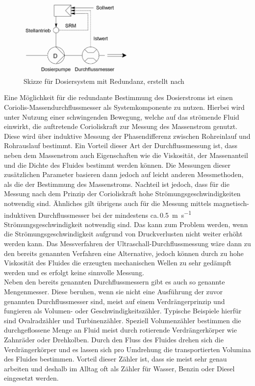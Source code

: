 \begin{figure}[h!]
	\centering
	\includegraphics[width=0.5\textwidth]{img/redundanz}
	\caption{Skizze für Dosiersystem mit Redundanz, erstellt nach \cite{Vetter.2002}}
	\label{fig:redundanz}
\end{figure}
\FloatBarrier


Eine Möglichkeit für die redundante Bestimmung des Dosierstroms ist einen Coriolis-Massendurchflussmesser als Systemkomponente zu nutzen. Hierbei wird unter Nutzung einer schwingenden Bewegung, welche auf das strömende Fluid einwirkt, die auftretende Corioliskraft zur Messung des Massenstrom genutzt. Diese wird über induktive Messung der Phasendifferenz zwischen Rohreinlauf und Rohrauslauf bestimmt. Ein Vorteil dieser Art der Durchflussmessung ist, dass neben dem Massenstrom auch Eigenschaften wie die Viskosität, der Massenanteil und die Dichte des Fluides bestimmt werden können. Die Messungen dieser zusätzlichen Parameter basieren dann jedoch auf leicht anderen Messmethoden, als die der Bestimmung des Massenstroms. \cite{Ignatowitz.2015}\linebreak
Nachteil ist jedoch, dass für die Messung nach dem Prinzip der Corioliskraft hohe Strömungsgeschwindigkeiten notwendig sind. Ähnliches gilt übrigens auch für die Messung mittels magnetisch-induktiven Durchflussmesser bei der mindestens ca.\,\SI{0,5}{\meter \per \second} Strömungsgeschwindigkeit notwendig sind. Das kann zum Problem werden, wenn die Strömungsgeschwindigkeit aufgrund von Druckverlusten nicht weiter erhöht werden kann. Das Messverfahren der Ultraschall-Durchflussmessung wäre dann zu den bereits genannten Verfahren eine Alternative, jedoch können durch zu hohe Viskosität des Fluides die erzeugten mechanischen Wellen zu sehr gedämpft werden und es erfolgt keine sinnvolle Messung. \cite{D.Stepanek.Unbekannt, Wikipedia.2021,Wikipedia.2020}\\
Neben den bereits genannten Durchflussmessern gibt es auch so genannte Mengenmesser. Diese beruhen, wenn sie nicht eine Ausführung der zuvor genannten Durchflussmesser sind, meist auf einem Verdrängerprinzip und fungieren als Volumen- oder Geschwindigkeitszähler. Typische Beispiele hierfür sind Ovalradzähler und Turbinenzähler. Speziell Volumenzähler bestimmen die durchgeflossene Menge an Fluid meist durch rotierende Verdrängerkörper wie Zahnräder oder Drehkolben. Durch den Fluss des Fluides drehen sich die Verdrängerkörper und es lassen sich pro Umdrehung die transportierten Volumina des Fluides bestimmen. Vorteil dieser Zähler ist, dass sie meist sehr genau arbeiten und deshalb im Alltag oft als Zähler für Wasser, Benzin  oder Diesel eingesetzt werden. \cite{Ignatowitz.2015}\linebreak
